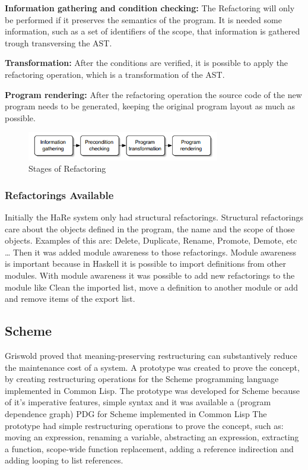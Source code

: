{\bf Information gathering and condition checking:} The Refactoring will only be performed if it preserves the semantics of the program.
It is needed some information, such as a set of identifiers of the scope, that information is gathered trough transversing the AST.

{\bf Transformation:} After the conditions are verified, it is possible to apply the refactoring operation, which is a transformation of the AST.

{\bf Program rendering:} After the refactoring operation the source code of the new program needs to be generated, keeping the original program layout as much as possible.

\begin{figure}[h!]
  \centering
  \includegraphics[width=0.75\textwidth]{img/HaReStagesOfRefactoring.png}
  \caption{Stages of Refactoring}
  \label{fig:HaReStages}
\end{figure}

\subsubsection{Refactorings Available} %
\hfill \break

Initially the HaRe system only had structural refactorings. 
Structural refactorings care about the objects defined in the program, the name and the scope of those objects. Examples of this are: Delete, Duplicate, Rename, Promote, Demote, etc \ldots
Then it was added module awareness to those refactorings. 
Module awareness is important because in Haskell it is possible to import definitions from other modules.
With module awareness it was possible to add new refactorings to the module like Clean the imported list, move a definition to another module or add and remove items of the export list.


\subsection{Scheme}

Griswold \cite{griswold1991program} proved that meaning-preserving restructuring can substantively reduce the maintenance cost of a system.
A prototype was created to prove the concept, by creating restructuring operations for the Scheme programming language implemented in Common Lisp.
The prototype was developed for Scheme because of it's imperative features, simple syntax and it was available a (program dependence graph) PDG for Scheme implemented in Common Lisp
The prototype had simple restructuring operations to prove the concept, such as: moving an expression, renaming a variable, abstracting an expression, extracting a function, scope-wide function replacement, adding a reference indirection and adding looping to list references.

